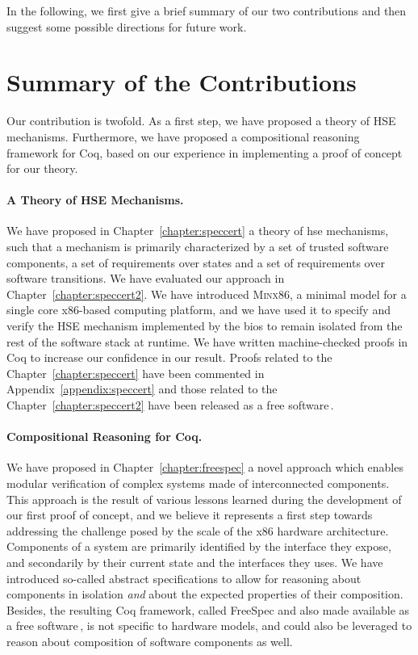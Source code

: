 In the following, we first give a brief summary of our two contributions and
then suggest some possible directions for future work.

\section{Summary of the Contributions}
\label{sec:conclusion:summary}

Our contribution is twofold.
%
As a first step, we have proposed a theory of HSE mechanisms.
%
Furthermore, we have proposed a compositional reasoning framework for Coq, based
on our experience in implementing a proof of concept for our theory.

\paragraph{A Theory of HSE Mechanisms.}
%
We have proposed in Chapter~\ref{chapter:speccert} a theory of \ac{hse}
mechanisms, such that a mechanism is primarily characterized by a set of trusted
software components, a set of requirements over states and a set of requirements
over software transitions.
%
We have evaluated our approach in Chapter~\ref{chapter:speccert2}.
%
We have introduced {\scshape Minx86}, a minimal model for a single core
x86-based computing platform, and we have used it to specify and verify the HSE
mechanism implemented by the \ac{bios} to remain isolated from the rest of the
software stack at runtime.
%
We have written machine-checked proofs in Coq to increase our confidence in our
result.
%
Proofs related to the Chapter~\ref{chapter:speccert} have been commented in
Appendix~\ref{appendix:speccert} and those related to the
Chapter~\ref{chapter:speccert2} have been released as a free
software\,\cite{letan2016speccertcode}.

\paragraph{Compositional Reasoning for Coq.}
%
We have proposed in Chapter~\ref{chapter:freespec} a novel approach which
enables modular verification of complex systems made of interconnected
components.
%
This approach is the result of various lessons learned during the development of
our first proof of concept, and we believe it represents a first step towards
addressing the challenge posed by the scale of the x86 hardware architecture.
%
Components of a system are primarily identified by the interface they expose,
and secondarily by their current state and the interfaces they uses.
%
We have introduced so-called abstract specifications to allow for reasoning
about components in isolation \emph{and} about the expected properties of their
composition.
%
Besides, the resulting Coq framework, called FreeSpec and also made available as
a free software\,\cite{letan2018freespeccode}, is not specific to hardware
models, and could also be leveraged to reason about composition of software
components as well.

